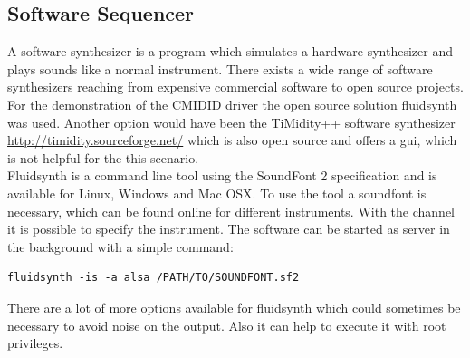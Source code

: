 \documentclass[paper=a4,fontsize=11pt,twocolumn,pagesize,bibtotoc]{scrartcl}
\begin{document}
\subsection{Software Sequencer}
\label{softwaresequencer}
A software synthesizer is a program which simulates a hardware synthesizer and plays sounds like a normal instrument. There exists a wide range of software synthesizers reaching from expensive commercial software to open source projects. For the demonstration of the CMIDID driver the open source solution fluidsynth was used. Another option would have been the
TiMidity++ software synthesizer \url{http://timidity.sourceforge.net/} which is also open source and offers a gui, which is not helpful for the this scenario.
\\
Fluidsynth is a command line tool using the SoundFont 2 specification and is available for Linux, Windows and Mac OSX. To use the tool a soundfont is necessary, which can be found online for different instruments. With the channel it is possible to specify the instrument. The software can be started as server in the background with a simple command:
\begin{lstlisting}
fluidsynth -is -a alsa /PATH/TO/SOUNDFONT.sf2
\end{lstlisting}
There are a lot of more options available for fluidsynth which could sometimes be necessary to avoid noise on the output. Also it can help to execute it with root privileges.
\cite{fluidsynth}



	
	
\end{document}
